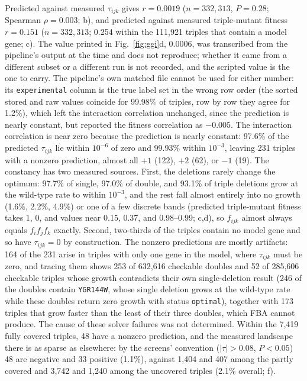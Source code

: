  Predicted against measured $\tau_{ijk}$ gives $r=0.0019$ ($n=332{,}313$,
$P=0.28$; Spearman $\rho=0.003$; b), and predicted against measured
triple-mutant fitness $r=0.151$ ($n=332{,}313$; 0.254 within the 111,921 triples that
contain a model gene; c). The value printed in Fig.~\ref{fig:ggi}d, 0.0006,
was transcribed from the pipeline's output at the time and does not reproduce; whether it
came from a different subset or a different run is not recorded, and the scripted value is
the one to carry. The pipeline's own matched file cannot be used for either number: its
\texttt{experimental} column is the true label set in the wrong row order (the sorted stored
and raw values coincide for 99.98\% of triples, row by row they agree for 1.2\%), which left
the interaction correlation unchanged, since the prediction is nearly constant, but reported
the fitness correlation as $-0.005$. The interaction correlation is near zero because the
prediction is nearly constant: 97.6\% of the predicted $\tau_{ijk}$ lie within $10^{-6}$ of
zero and 99.93\% within $10^{-3}$, leaving 231 triples with a nonzero prediction, almost all
$+1$ (122), $+2$ (62), or $-1$ (19). The constancy has two measured sources. First, the
deletions rarely change the optimum: 97.7\% of single, 97.0\% of double, and 93.1\% of triple
deletions grow at the wild-type rate to within $10^{-3}$, and the rest fall almost entirely
into no growth (1.6\%, 2.2\%, 4.9\%) or one of a few discrete bands (predicted triple-mutant
fitness takes 1, 0, and values near 0.15, 0.37, and 0.98--0.99; c,d), so
$f_{ijk}$ almost always equals $f_if_jf_k$ exactly. Second, two-thirds of the triples contain
no model gene and so have $\tau_{ijk}=0$ by construction. The nonzero predictions are mostly
artifacts: 164 of the 231 arise in triples with only one gene in the model, where
$\tau_{ijk}$ must be zero, and tracing them shows 253 of 632,616 checkable doubles and 52 of
285,606 checkable triples whose growth contradicts their own single-deletion result (246 of
the doubles contain \texttt{YGR144W}, whose single deletion grows at the wild-type rate while
these doubles return zero growth with status \texttt{optimal}), together with 173 triples
that grow faster than the least of their three doubles, which FBA cannot produce. The cause
of these solver failures was not determined. Within the 7,419 fully covered triples, 48 have
a nonzero prediction, and the measured landscape there is as sparse as elsewhere: by the
screens' convention ($\lvert\tau\rvert>0.08$, $P<0.05$) 48 are negative and 33 positive
(1.1\%), against 1,404 and 407 among the partly covered and 3,742 and 1,240 among the
uncovered triples (2.1\% overall; f).


